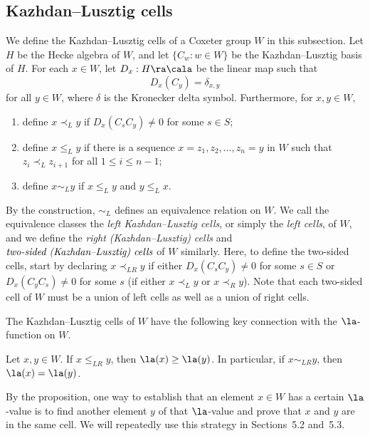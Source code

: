 \subsection{Kazhdan--Lusztig cells}
We define the Kazhdan--Lusztig cells of a Coxeter group $W$ in this subsection. 
Let $H$ be the Hecke algebra of $W$, and let $\{C_w:w\in W\}$
be the Kazhdan--Lusztig basis of $H$. For each $x\in W$, let $D_x:H\ra \cala$
be the linear map such that 
\[
 D_{x}(C_y)=\delta_{x,y}
\]
for all $y\in W$, where $\delta$ is the Kronecker delta symbol. 
Furthermore, for $x,y\in W$,
\begin{enumerate}[leftmargin=2em]
 \item define $x\prec_L y$ if $D_{x}(C_sC_y)\neq 0$ for some
 $s\in S$;
 \item define $x\le_L y$ if there is a sequence $x=z_1,z_2,\ldots,z_n=y$ in
 $W$ such that $z_{i}\prec_L z_{i+1}$ for all $1\le i\le n-1$;
 \item define $x\sim_L y$ if $x\le_L y$ and $y\le_L x$.
\end{enumerate}
By the construction, $\sim_L$ defines an equivalence
relation on $W$. 
%
%
We call the equivalence classes the
\emph{left Kazhdan--Lusztig cells}, or simply the \emph{left cells}, of $W$,
and we define the \emph{right (Kazhdan--Lusztig) cells}
and $\emph{two-sided (Kazhdan--Lusztig) cells}$ of $W$ similarly. Here, to
define the two-sided cells, start by declaring $x\prec_{LR} y$ if either
$D_{x}(C_sC_y)\neq 0$ for some $s\in S$ or $D_x(C_yC_s)\neq 0$ for some $s$
(\ie if either $x\prec_L y$ or $x\prec_R y$).
Note that each two-sided cell of $W$ must be a union of left cells as well as a
union of right cells. 

The Kazhdan--Lusztig cells of $W$ have the following key connection with the
$\la$-function on $W$.

\begin{prop}[{\cite[Section 14]{LG}}]
 \label{constant}
 Let $x,y\in W$. If $x\le_{LR} y$, then $\la(x)\ge \la(y)$. In particular, if
 $x\sim_{LR} y$, then $\la(x)=\la(y)$.
\end{prop}

By the proposition, one way to establish that an element $x\in W$ has a certain
$\la$-value is to find another element $y$ of that $\la$-value and prove that
$x$ and $y$ are in the same cell. We will repeatedly use this strategy in
Sections~5.2 and~5.3.

